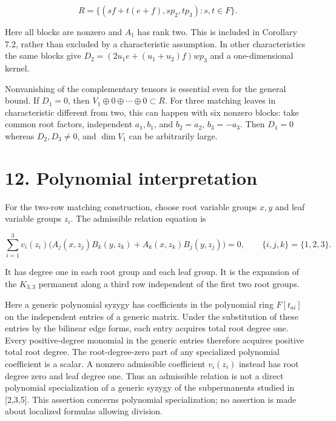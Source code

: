 \documentclass[11pt]{article}
\begin{document}
\nopagebreak[4]

\begin{equation}
R=\{(sf+t(e+f),sp_2,tp_3):s,t\in F\}.
\tag{63}
\end{equation}

Here all blocks are nonzero and $A_1$ has rank two. This is included in Corollary 7.2, rather than excluded by a characteristic assumption. In other characteristics the same blocks give $D_2=(2u_1e+(u_1+u_2)f)wp_3$ and a one-dimensional kernel.


Nonvanishing of the complementary tensors is essential even for the general bound. If $D_1=0$, then $V_1\oplus0\oplus\cdots\oplus0\subset R$. For three matching leaves in characteristic different from two, this can happen with six nonzero blocks: take common root factors, independent $a_1,b_1$, and $b_2=a_2$, $b_3=-a_3$. Then $D_1=0$ whereas $D_2,D_3\ne0$, and $\dim V_1$ can be arbitrarily large.


\section*{12. Polynomial interpretation}

For the two-row matching construction, choose root variable groups $x,y$ and leaf variable groups $z_i$. The admissible relation equation is


\nopagebreak[4]

\begin{equation}
\sum_{i=1}^3 v_i(z_i)
\bigl(A_j(x,z_j)B_k(y,z_k)+A_k(x,z_k)B_j(y,z_j)\bigr)=0,
\qquad\{i,j,k\}=\{1,2,3\}.
\tag{64}
\end{equation}

It has degree one in each root group and each leaf group. It is the expansion of the $K_{3,3}$ permanent along a third row independent of the first two root groups.


Here a generic polynomial syzygy has coefficients in the polynomial ring $F[t_{ai}]$ on the independent entries of a generic matrix. Under the substitution of these entries by the bilinear edge forms, each entry acquires total root degree one. Every positive-degree monomial in the generic entries therefore acquires positive total root degree. The root-degree-zero part of any specialized polynomial coefficient is a scalar. A nonzero admissible coefficient $v_i(z_i)$ instead has root degree zero and leaf degree one. Thus an admissible relation is not a direct polynomial specialization of a generic syzygy of the subpermanents studied in [2,3,5]. This assertion concerns polynomial specialization; no assertion is made about localized formulas allowing division.
\end{document}
